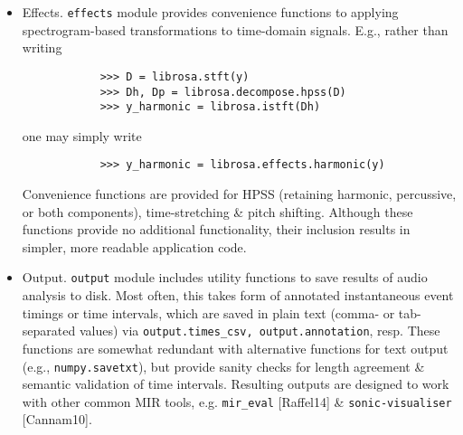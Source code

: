 \documentclass{article}
\begin{document}
\begin{itemize}
\begin{itemize}
		{\tt decompose} module provides a simple interface to factor spectrograms (or general feature arrays) into {\it components \& activations}:
		\begin{verbatim}
			>>> comps, acts = librosa.decompose.decompose(S)
		\end{verbatim}
		By default, {\tt decompose()} function constructs a {\tt scikit-learn} NMF object, \& applies its \verb|fit_transform()| method to transpose of $S$. Resulting basis components \& activations are accordingly transposed, so that {\tt comps.dot(acts)} approximates $S$. If user wishes to apply some other decomposition technique, any object fitting {\tt sklearn.decomposition} interface may be substituted:
		\begin{verbatim}
			>>> T = SomeDecomposer()
			>>> librosa.decompose.decompose(S, transformer=T)
		\end{verbatim}
		In addition to general-purpose matrix decomposition techniques, librosa also implements harmonic-percussion source separation (HPSS) method of {\sc Fitzgerald} [Fitzgerald10] as {\tt decompose.hpss}. This technique is commonly used in MIR to suppress transients when analyzing pitch content, or suppress stationary signals when detecting onsets or other rhythmic elements. An example application of HPSS is illustrated in {\sf Fig. 4: Top: separated harmonic \& percussive waveforms. Middle: Mel spectrogram of harmonic component. Bottom: Mel spectrogram of percussive component.}
		\item {\sf Effects.} {\tt effects} module provides convenience functions to applying spectrogram-based transformations to time-domain signals. E.g., rather than writing
		\begin{verbatim}
			>>> D = librosa.stft(y)
			>>> Dh, Dp = librosa.decompose.hpss(D)
			>>> y_harmonic = librosa.istft(Dh)
		\end{verbatim}
		one may simply write
		\begin{verbatim}
			>>> y_harmonic = librosa.effects.harmonic(y)
		\end{verbatim}
		Convenience functions are provided for HPSS (retaining harmonic, percussive, or both components), time-stretching \& pitch shifting. Although these functions provide no additional functionality, their inclusion results in simpler, more readable application code.
		\item {\sf Output.} {\tt output} module includes utility functions to save results of audio analysis to disk. Most often, this takes form of annotated instantaneous event timings or time intervals, which are saved in plain text (comma- or tab-separated values) via \verb|output.times_csv, output.annotation|, resp. These functions are somewhat redundant with alternative functions for text output (e.g., {\tt numpy.savetxt}), but provide sanity checks for length agreement \& semantic validation of time intervals. Resulting outputs are designed to work with other common MIR tools, e.g. \verb|mir_eval| [Raffel14] \& {\tt sonic-visualiser} [Cannam10].
		

\end{itemize}
\end{itemize}
\end{document}
